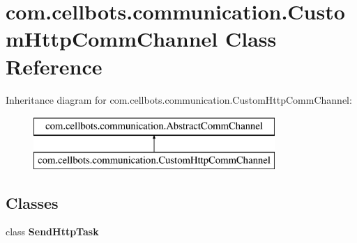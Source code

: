 \hypertarget{classcom_1_1cellbots_1_1communication_1_1_custom_http_comm_channel}{\section{com.\-cellbots.\-communication.\-Custom\-Http\-Comm\-Channel Class Reference}
\label{classcom_1_1cellbots_1_1communication_1_1_custom_http_comm_channel}
}
Inheritance diagram for com.\-cellbots.\-communication.\-Custom\-Http\-Comm\-Channel\-:\begin{figure}[H]
\begin{center}
\leavevmode
\includegraphics[height=2.000000cm]{classcom_1_1cellbots_1_1communication_1_1_custom_http_comm_channel}
\end{center}
\end{figure}
\subsection*{Classes}
\begin{DoxyCompactItemize}
\item 
class {\bfseries Send\-Http\-Task}
\end{DoxyCompactItemize}
